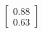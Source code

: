 \documentclass[preview]{standalone}
\begin{document}
\begin{align*}
\begin{bmatrix} 0.88 \\ 0.63 \end{bmatrix}
\end{align*}
\end{document}
